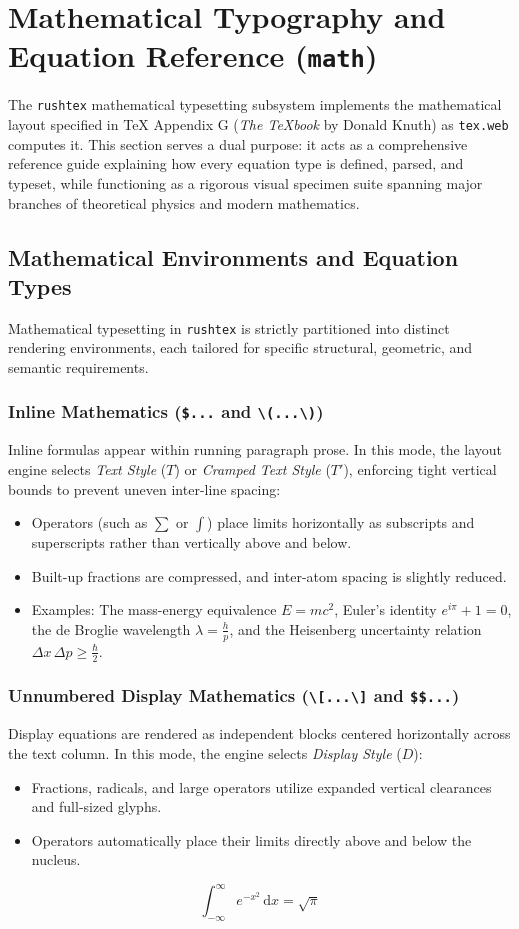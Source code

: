 \documentclass[11pt, a4paper]{article}
\begin{document}
\bigskip

\section{Mathematical Typography and Equation Reference (\texttt{math})}
The \texttt{rushtex} mathematical typesetting subsystem implements the mathematical layout specified in TeX Appendix G (\emph{The TeXbook} by Donald Knuth) as \texttt{tex.web} computes it. This section serves a dual purpose: it acts as a comprehensive reference guide explaining how every equation type is defined, parsed, and typeset, while functioning as a rigorous visual specimen suite spanning major branches of theoretical physics and modern mathematics.

\subsection{Mathematical Environments and Equation Types}
Mathematical typesetting in \texttt{rushtex} is strictly partitioned into distinct rendering environments, each tailored for specific structural, geometric, and semantic requirements.

\subsubsection{Inline Mathematics (\texttt{\$...} and \texttt{\textbackslash(...\textbackslash)})}
Inline formulas appear within running paragraph prose. In this mode, the layout engine selects \emph{Text Style} ($T$) or \emph{Cramped Text Style} ($T'$), enforcing tight vertical bounds to prevent uneven inter-line spacing:
\begin{itemize}
\item Operators (such as $\sum$ or $\int$) place limits horizontally as subscripts and superscripts rather than vertically above and below.
\item Built-up fractions are compressed, and inter-atom spacing is slightly reduced.
\item Examples: The mass-energy equivalence $E = mc^2$, Euler's identity $e^{i\pi} + 1 = 0$, the de Broglie wavelength $\lambda = \frac{h}{p}$, and the Heisenberg uncertainty relation $\Delta x \, \Delta p \ge \frac{\hbar}{2}$.
\end{itemize}

\subsubsection{Unnumbered Display Mathematics (\texttt{\textbackslash[...\textbackslash]} and \texttt{\$\$...})}
Display equations are rendered as independent blocks centered horizontally across the text column. In this mode, the engine selects \emph{Display Style} ($D$):
\begin{itemize}
\item Fractions, radicals, and large operators utilize expanded vertical clearances and full-sized glyphs.
\item Operators automatically place their limits directly above and below the nucleus.
\end{itemize}
\[
\int_{-\infty}^{\infty} e^{-x^2} \, \mathrm{d}x = \sqrt{\pi}
\]
\end{document}
